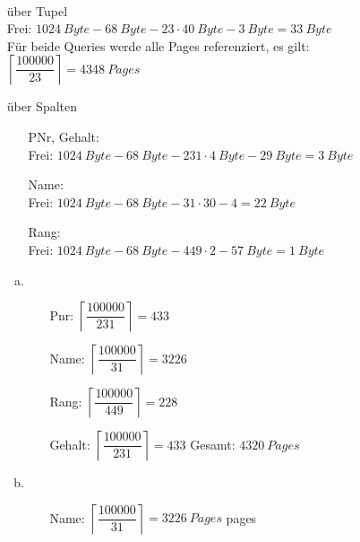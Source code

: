 \documentclass{uni_tue_template}
\begin{document}
		\newpage
	\item \hfill\\
		\begin{enumerate}
			\item[über Tupel]\hfill\\
				Frei: $\SI{1024}{Byte} - \SI{68}{Byte} - 23 \cdot \SI{40}{Byte} - \SI{3}{Byte} = \SI{33}{Byte}$\\
				Für beide Queries werde alle Pages referenziert, es gilt:
				$\left\lceil\dfrac{100000}{23}\right\rceil = \SI{4348}{Pages}$
			\item[über Spalten]\hfill\\
				\begin{enumerate}
					\item[PNr, Gehalt:]\hfill\\
						Frei: $\SI{1024}{Byte} - \SI{68}{Byte} - 231 \cdot \SI{4}{Byte} - \SI{29}{Byte} = \SI{3}{Byte}$
					\item[Name:]\hfill\\
						Frei: $\SI{1024}{Byte} - \SI{68}{Byte} - 31 \cdot 30 - 4 = \SI{22}{Byte}$
					\item[Rang:]\hfill\\
						Frei: $\SI{1024}{Byte} - \SI{68}{Byte} - 449 \cdot 2 - \SI{57}{Byte} = \SI{1}{Byte}$
				\end{enumerate}
				\begin{enumerate}[(a)]
					\item\hfill\\
						\begin{enumerate}
							\item[Pnr:]
								$\left\lceil\dfrac{100000}{231}\right\rceil = 433$
							\item[Name:]
								$\left\lceil\dfrac{100000}{31}\right\rceil = 3226$
 							\item[Rang:]
 								$\left\lceil\dfrac{100000}{449}\right\rceil = 228$
							\item[Gehalt:]
								$\left\lceil\dfrac{100000}{231}\right\rceil = 433$
								Gesamt: $\SI{4320}{Pages}$
						\end{enumerate}
					\item\hfill\\
						\begin{enumerate}
							\item[Name:]
								 $\left\lceil\dfrac{100000}{31}\right\rceil = \SI{3226}{Pages}$ pages
						\end{enumerate}
				\end{enumerate}
		\end{enumerate}
\end{document}
